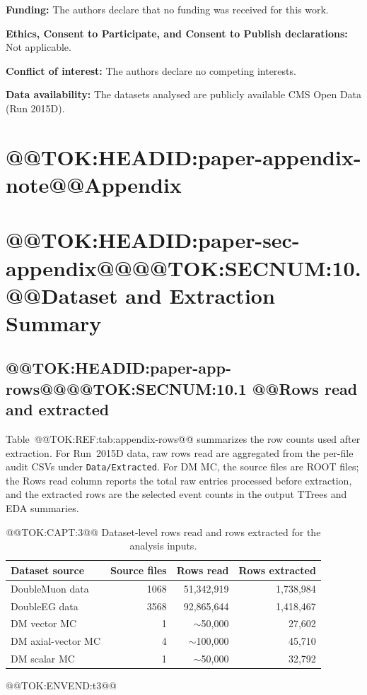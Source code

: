 \documentclass[11pt]{article}
\begin{document}
\noindent\textbf{Funding:} The authors declare that no funding was received for this work.

\noindent\textbf{Ethics, Consent to Participate, and Consent to Publish declarations:} Not applicable.

\noindent\textbf{Conflict of interest:} The authors declare no competing interests.

\noindent\textbf{Data availability:} The datasets analysed are publicly available CMS Open Data (Run 2015D).



\appendix

\section*{@@TOK:HEADID:paper-appendix-note@@Appendix}


\section{@@TOK:HEADID:paper-sec-appendix@@@@TOK:SECNUM:10. @@Dataset and Extraction Summary}

\subsection{@@TOK:HEADID:paper-app-rows@@@@TOK:SECNUM:10.1 @@Rows read and extracted}

Table~@@TOK:REF:tab:appendix-rows@@ summarizes the row counts used after extraction.
For Run~2015D data, raw rows read are aggregated from the per-file audit CSVs under
\texttt{Data/Extracted}. For DM MC, the source files are ROOT files; the
Rows read column reports the total raw entries processed before extraction, and
the extracted rows are the selected event counts in the output TTrees and EDA summaries.

\begin{table}[h]
\centering
\scriptsize
\caption{@@TOK:CAPT:3@@ Dataset-level rows read and rows extracted for the analysis inputs.}
\label{tab:appendix-rows}
%
\begin{tabular}{lrrr}
\toprule
Dataset source & Source files & Rows read & Rows extracted \\
\midrule
DoubleMuon data & 1068 & 51,342,919 & 1,738,984 \\
DoubleEG data & 3568 & 92,865,644 & 1,418,467 \\
DM vector MC & 1 & $\sim$50,000 & 27,602 \\
DM axial-vector MC & 4 & $\sim$100,000 & 45,710 \\
DM scalar MC & 1 & $\sim$50,000 & 32,792 \\
\bottomrule
\end{tabular}

@@TOK:ENVEND:t3@@\end{table}
\end{document}
